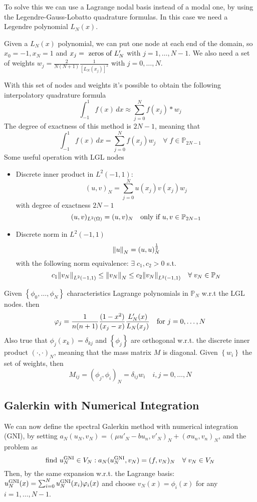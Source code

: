 To solve this we can use a Lagrange nodal basis instead of a modal one, by using the Legendre-Gauss-Lobatto quadrature formulas.
In this case we need a Legendre polynomial \(L_N(x)\).

Given a \(L_N(x)\) polynomial, we can put one node at each end of the domain, so \(x_0 = -1, x_N =  1\) and \(x_j = \text{ zeros of }L'
_N\) with \(j =  1, \ldots, N-1\). We also need a set of weights \(w_j = \frac{2}{N(N+1)} \frac{1}{[L_N(x_j)]^2}\) with \(j = 0, \ldots, N\).

With this set of nodes and weights it's possible to obtain the following interpolatory quadrature formula
\[
    \int_{-1}^1 f(x) \, dx \approx \sum_{j=0}^{N} f(x_j)*w_j
\]
The degree of exactness of this method is \(2N-1\), meaning that 
\[
    \int_{-1}^1 f(x)\,dx = \sum_{j=0}^{N} f(x_j)w_j \quad \forall \; f \in \mathbb{P}_{2N-1}
\]
Some useful operation with LGL nodes
\begin{itemize}
    \item Discrete inner product in \(L^2(-1,1)\):
    \[
        (u,v)_N = \sum_{j=0}^{N} u(x_j)v(x_j)w_j 
    \]
    with degree of exactness \(2N-1\) 
    \[
        (u,v)_{L^2(\Omega)} = (u,v)_N \quad \text{only if } u, v \in \mathbb{P}_{2N-1}
    \]
    \item Discrete norm in \(L^2(-1,1)\)
    \[
        \norm{u}_N = (u,u)_N^{\frac{1}{2}}
    \]
    with the following norm equivalence: \(\exists \; c_1, c_2 > 0\) s.t.
    \[
        c_1 \norm{v_N}_{L^2(-1,1)} \leq \norm{v_N}_N \leq c_2 \norm{v_N}_{L^2(-1,1)} \quad \forall \; v_N \in \mathbb{P}_N
    \]
\end{itemize}
Given \(\left\{\phi_0, \ldots, \phi_N\right\}\) characteristics Lagrange polynomials in \(\mathbb{P}_N\) w.r.t the LGL nodes. then
\[
    \varphi_j = \frac{1}{n(n+1)} \frac{(1-x^2)}{(x_j-x)}\frac{L'_N(x)}{L_N(x_j)} \quad \text{for } j = 0, \ldots, N
\]
Also true that \(\phi_j(x_k) = \delta_{kj}\) and \(\left\{\phi_j\right\}\) are orthogonal w.r.t. the discrete inner product \((\cdot,\cdot)_N\), meaning that the mass matrix \(M\) is diagonal. Given \(\left\{w_i\right\}\) the set of weights, then 
\[
    M_{ij} = (\phi_j, \phi_i)_N = \delta_{ij}w_i  \quad i,j  = 0, \ldots, N
\]
\subsection{Galerkin with Numerical Integration}
We can now define the spectral Galerkin method with numerical integration (GNI), by setting \(a_N(u_N, v_N) = (\mu u'_N-b u_n, v'_N)_N+(\sigma u_n, v_n)_N\), and the problem as
\[
    \text{find } u_N^{\text{GNI}} \in V_N : a_N(u_N^{\text{GNI}},v_N)=(f, v_N)_N \quad \forall \; v_N \in V_N
\]
Then, by the same expansion w.r.t. the Lagrange basis: \(u_N^{\text{GNI}}(x) =  \sum_{i=0}^{N}u_N^{\text{GNI}}(x_i)\varphi_i(x)\) and choose \(v_N(x) = \phi_i(x)\) for any \(i = 1, \ldots, N-1\).  

